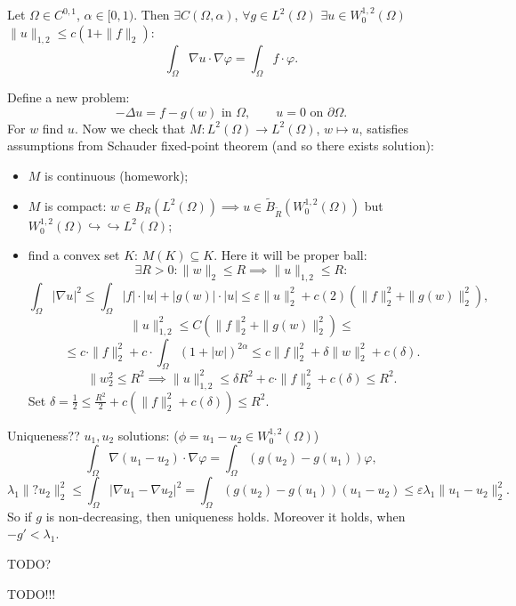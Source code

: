 \documentclass[12pt]{article}					%
\begin{document}
\begin{lemma}
	Let $Ω \in C^{0, 1}$, $α \in [0, 1)$. Then $\exists C(Ω, α)$, $\forall g \in L^2(Ω)$ $\exists u \in W_0^{1, 2}(Ω)$ $\|u\|_{1, 2} ≤ c(1 + \|f\|_2)$:
	$$ \int_Ω \nabla u · \nabla φ = \int_Ω f·φ. $$

	\begin{dukazin}
		Define a new problem:
		$$ - Δu = f - g(w) \text{ in } Ω, \qquad u = 0 \text{ on } \partial Ω. $$
		For $w$ find $u$. Now we check that $M: L^2(Ω) \rightarrow L^2(Ω)$, $w \mapsto u$, satisfies assumptions from Schauder fixed-point theorem (and so there exists solution):

		\begin{itemize}
			\item $M$ is continuous (homework);
			\item $M$ is compact: $w \in B_R(L^2(Ω)) \implies u \in \tilde B_{\tilde R}(W_0^{1, 2}(Ω))$ but $W_0^{1, 2}(Ω) \hookrightarrow \hookrightarrow L^2(Ω)$;
			\item find a convex set $K$: $M(K) \subseteq K$. Here it will be proper ball:
				$$ \exists R > 0: \|w\|_2 ≤ R \implies \|u\|_{1, 2} ≤ R: $$
				$$ \int_Ω |\nabla u|^2 ≤ \int_Ω |f|·|u| + |g(w)|·|u| ≤ ε\|u\|_2^2 + c(2)(\|f\|_2^2 + \|g(w)\|_2^2), $$
				$$ \|u\|_{1, 2}^2 ≤ C(\|f\|_2^2 + \|g(w)\|_2^2) ≤ $$
				$$ ≤ c·\|f\|_2^2 + c·\int_Ω (1 + |w|)^{2α} ≤ c\|f\|_2^2 + \delta \|w\|_2^2 + c(δ). $$
				$$ \|w_2^2 ≤ R^2 \implies \|u\|_{1, 2}^2 ≤ \delta R^2 + c·\|f\|_2^2 + c(δ) ≤ R^2. $$
				Set $δ = \frac{1}{2} ≤ \frac{R^2}{2} + c(\|f\|_2^2 + c(δ)) ≤ R^2$.
		\end{itemize}

		Uniqueness?? $u_1, u_2$ solutions: ($\phi = u_1 - u_2 \in W_0^{1, 2}(\Omega)$)
		$$ \int_Ω \nabla (u_1 - u_2)·\nabla φ = \int_Ω (g(u_2) - g(u_1)) φ, $$
		$$ \lambda_1 \|? u_2\|_2^2 ≤ \int_Ω |\nabla u_1 - \nabla u_2|^2 = \int_Ω(g(u_2) - g(u_1))(u_1 - u_2) ≤ ελ_1 \|u_1 - u_2\|_2^2. $$
		So if $g$ is non-decreasing, then uniqueness holds. Moreover it holds, when $-g' < \lambda_1$.
	\end{dukazin}
\end{lemma}

TODO? %


TODO!!!
\end{document}
